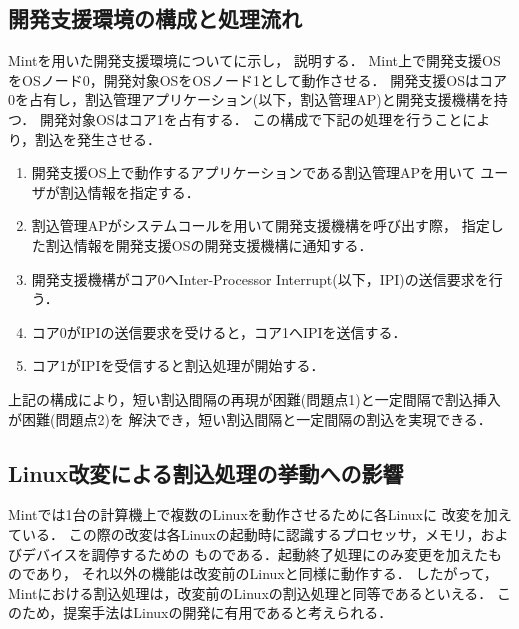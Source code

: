 \documentclass[submit,techreq,noauthor,dvipdfmx]{ipsj}
\begin{document}
\subsection{開発支援環境の構成と処理流れ}\label{sec:structure_and_processing_flow}


Mintを用いた開発支援環境についてに示し，
説明する．
Mint上で開発支援OSをOSノード0，開発対象OSをOSノード1として動作させる．
開発支援OSはコア0を占有し，割込管理アプリケーション(以下，割込管理AP)と開発支援機構を持つ．
開発対象OSはコア1を占有する．
この構成で下記の処理を行うことにより，割込を発生させる．

\begin{enumerate}
    \item 
        開発支援OS上で動作するアプリケーションである割込管理APを用いて
        ユーザが割込情報を指定する．
    \item 
        割込管理APがシステムコールを用いて開発支援機構を呼び出す際，
        指定した割込情報を開発支援OSの開発支援機構に通知する．   
    \item 
        開発支援機構がコア0へInter-Processor Interrupt(以下，IPI)の送信要求を行う．
    \item 
        コア0がIPIの送信要求を受けると，コア1へIPIを送信する．
    \item 
        コア1がIPIを受信すると割込処理が開始する．
\end{enumerate}
上記の構成により，短い割込間隔の再現が困難(問題点1)と一定間隔で割込挿入が困難(問題点2)を
解決でき，短い割込間隔と一定間隔の割込を実現できる．

\subsection{Linux改変による割込処理の挙動への影響}\label{sec:impact_to_linux}

Mintでは1台の計算機上で複数のLinuxを動作させるために各Linuxに
改変を加えている\cite{kitagawa}．
この際の改変は各Linuxの起動時に認識するプロセッサ，メモリ，およびデバイスを調停するための
ものである．起動終了処理にのみ変更を加えたものであり，
それ以外の機能は改変前のLinuxと同様に動作する．
したがって，Mintにおける割込処理は，改変前のLinuxの割込処理と同等であるといえる．
このため，提案手法はLinuxの開発に有用であると考えられる．
\end{document}
